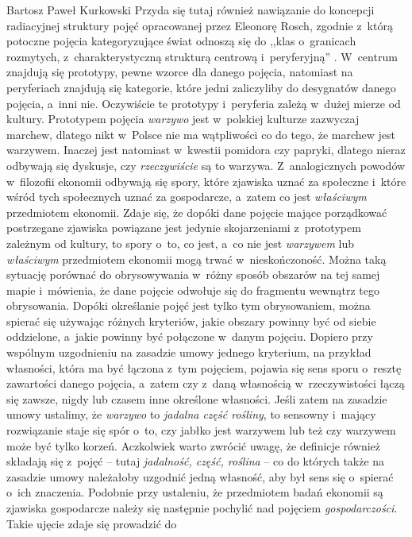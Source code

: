 \begin{artplenv}{Bartosz Paweł Kurkowski}
Przyda się tutaj również nawiązanie do koncepcji radiacyjnej struktury pojęć opracowanej przez Eleonorę Rosch,
zgodnie z~którą potoczne pojęcia kategoryzujące świat odnoszą się do ,,klas o~granicach
rozmytych, z~charakterystyczną strukturą
centrową i~peryferyjną''
\parencite[s.~110]{grzegorczykowa_o_1998}.
W~centrum znajdują się prototypy,
pewne wzorce dla danego pojęcia, natomiast na peryferiach znajdują się kategorie, które jedni zaliczyliby do desygnatów
danego pojęcia, a~inni nie. Oczywiście te prototypy i~peryferia zależą w~dużej mierze od kultury. Prototypem pojęcia
\textit{warzywo} jest w~polskiej kulturze zazwyczaj marchew, dlatego nikt w~Polsce nie ma wątpliwości co do tego, że
marchew jest warzywem. Inaczej jest natomiast w~kwestii pomidora czy papryki, dlatego nieraz odbywają się dyskusje, czy
\textit{rzeczywiście} są to warzywa. Z~analogicznych powodów w~filozofii ekonomii odbywają się spory, które zjawiska
uznać za społeczne i~które wśród tych społecznych uznać za gospodarcze, a~zatem co jest \textit{właściwym} przedmiotem
ekonomii. Zdaje się, że dopóki dane pojęcie mające porządkować postrzegane zjawiska powiązane jest jedynie
skojarzeniami z~prototypem zależnym od kultury, to spory o~to, co jest, a~co nie jest \textit{warzywem} lub
\textit{właściwym }przedmiotem ekonomii mogą trwać w~nieskończoność. Można taką sytuację porównać do
obrysowywania w~różny sposób obszarów na tej samej mapie i~mówienia, że dane pojęcie odwołuje się do fragmentu wewnątrz tego
obrysowania. Dopóki określanie pojęć jest tylko tym obrysowaniem, można spierać się używając różnych kryteriów, jakie
obszary powinny być od siebie oddzielone, a~jakie powinny być połączone w~danym pojęciu. Dopiero przy wspólnym
uzgodnieniu na zasadzie umowy jednego kryterium, na przykład własności, która ma być łączona z~tym pojęciem, pojawia się
sens sporu o~resztę zawartości danego pojęcia, a~zatem czy z~daną własnością w~rzeczywistości łączą się zawsze, nigdy
lub czasem inne określone własności. Jeśli zatem na zasadzie umowy ustalimy, że \textit{warzywo} to \textit{jadalna
część rośliny}, to sensowny i~mający rozwiązanie staje się spór o~to, czy jabłko jest warzywem lub też czy warzywem
może być tylko korzeń. Aczkolwiek warto zwrócić uwagę, że definicje również składają się z~pojęć -- tutaj
\textit{jadalność, część, roślina} -- co do których także na zasadzie umowy należałoby uzgodnić jedną własność, aby był
sens się o~spierać o~ich znaczenia. Podobnie przy ustaleniu, że przedmiotem badań ekonomii są zjawiska gospodarcze
należy się następnie pochylić nad pojęciem \textit{gospodarczości}. Takie ujęcie zdaje się prowadzić do

\end{artplenv}
